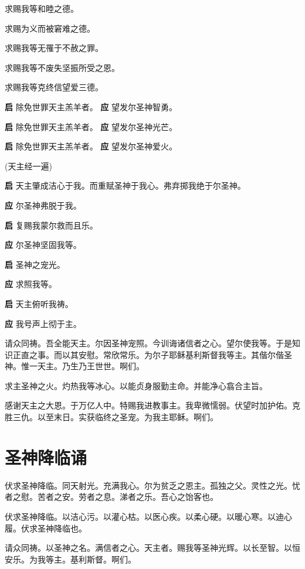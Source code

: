 \documentclass[UTF8,17pt]{ctexart}
\begin{document}
 求赐我等和睦之德。

 求赐为义⽽被窘难之德。

 求赐我等⽆罹于不赦之罪。

 求赐我等不废失坚振所受之恩。

 求赐我等克终信望爱三德。

\textbf{启} \quad 除免世罪天主羔⽺者。 \hfill \textbf{应} \quad 望发尔圣神智勇。

\textbf{启} \quad 除免世罪天主羔⽺者。 \hfill \textbf{应} \quad 望发尔圣神光芒。

\textbf{启} \quad 除免世罪天主羔⽺者。 \hfill \textbf{应} \quad 望发尔圣神爱⽕。

(天主经一遍)

\textbf{启} \quad 天主肇成洁⼼于我。⽽重赋圣神于我⼼。弗弃掷我绝于尔圣神。

\textbf{应} \quad 尔圣神弗脱于我。

\textbf{启} \quad 复赐我蒙尔救⽽且乐。

\textbf{应} \quad 尔圣神坚固我等。

\textbf{启} \quad 圣神之宠光。

\textbf{应} \quad 求照我等。

\textbf{启} \quad 天主俯听我祷。

\textbf{应} \quad 我号声上彻于主。

请众同祷。吾全能天主。尔因圣神宠照。今训诲诸信者之⼼。望尔使我等。于是知识正直之事。⽽以其安慰。常欣常乐。为尔⼦耶稣基利斯督我等主。其偕尔偕圣神。惟⼀天主。乃⽣乃王世世。啊们。

求主圣神之⽕。灼热我等冰⼼。以能贞⾝服勤主命。并能净⼼翕合主旨。

感谢天主之⼤恩。于万亿⼈中。特赐我进教事主。我卑微懦弱。伏望时加护佑。克胜三仇。以⾄末⽇。实获临终之圣宠。为我主耶稣。啊们。

\section{圣神降临诵}

伏求圣神降临。同天射光。充满我⼼。尔为贫乏之恩主。孤独之⽗。灵性之光。忧者之慰。苦者之安。劳者之息。涕者之乐。吾⼼之饴客也。

伏求圣神降临。以洁⼼污。以灌⼼枯。以医⼼疾。以柔⼼硬。以暖⼼寒。以迪⼼履。伏求圣神降临也。

请众同祷。以圣神之名。满信者之⼼。天主者。赐我等圣神光辉。以长⾄智。以恒安乐。为我等主。基利斯督。啊们。
\end{document}
